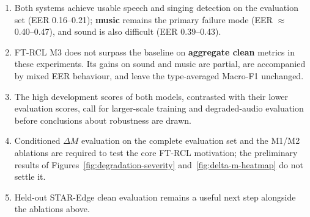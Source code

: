 \begin{enumerate}
  \item Both systems achieve usable speech and singing detection on the evaluation set (EER 0.16--0.21); \textbf{music} remains the primary failure mode (EER ${\approx}$ 0.40--0.47), and sound is also difficult (EER 0.39--0.43).
  \item FT-RCL M3 does not surpass the baseline on \textbf{aggregate clean} metrics in these experiments. Its gains on sound and music are partial, are accompanied by mixed EER behaviour, and leave the type-averaged Macro-F1 unchanged.
  \item The high development scores of both models, contrasted with their lower evaluation scores, call for larger-scale training and degraded-audio evaluation before conclusions about robustness are drawn.
  \item Conditioned $\Delta M$ evaluation on the complete evaluation set and the M1/M2 ablations are required to test the core FT-RCL motivation; the preliminary results of Figures~\ref{fig:degradation-severity} and~\ref{fig:delta-m-heatmap} do not settle it.
  \item Held-out STAR-Edge clean evaluation remains a useful next step alongside the ablations above.
\end{enumerate}
